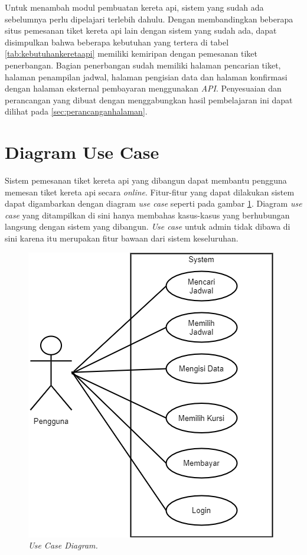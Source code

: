 Untuk menambah modul pembuatan kereta api, sistem yang sudah ada sebelumnya perlu dipelajari terlebih dahulu. Dengan membandingkan beberapa situs pemesanan tiket kereta api lain dengan sistem yang sudah ada, dapat disimpulkan bahwa beberapa kebutuhan yang tertera di tabel \ref{tab:kebutuhankeretaapi} memiliki kemiripan dengan pemesanan tiket penerbangan. Bagian penerbangan sudah memiliki halaman pencarian tiket, halaman penampilan jadwal, halaman pengisian data dan halaman konfirmasi dengan halaman eksternal pembayaran menggunakan \textit{API}. Penyesuaian dan perancangan yang dibuat dengan menggabungkan hasil pembelajaran ini dapat dilihat pada \ref{sec:perancanganhalaman}.

\section{Diagram Use Case}
\label{sec:usecase} 

Sistem pemesanan tiket kereta api yang dibangun dapat membantu pengguna memesan tiket kereta api secara \textit{online}. Fitur-fitur yang dapat dilakukan sistem dapat digambarkan dengan diagram \textit{use case} seperti pada gambar \ref{img:usecasediagram}. Diagram \textit{use case} yang ditampilkan di sini hanya membahas kasus-kasus yang berhubungan langsung dengan sistem yang dibangun. \textit{Use case} untuk admin tidak dibawa di sini karena itu merupakan fitur bawaan dari sistem keseluruhan. 

\begin{figure}[H]
\center
\includegraphics[scale=0.8]{Gambar/Use Case Diagram.png}
\caption{\textit{Use Case Diagram.}}
    \label{img:usecasediagram}
\end{figure}

